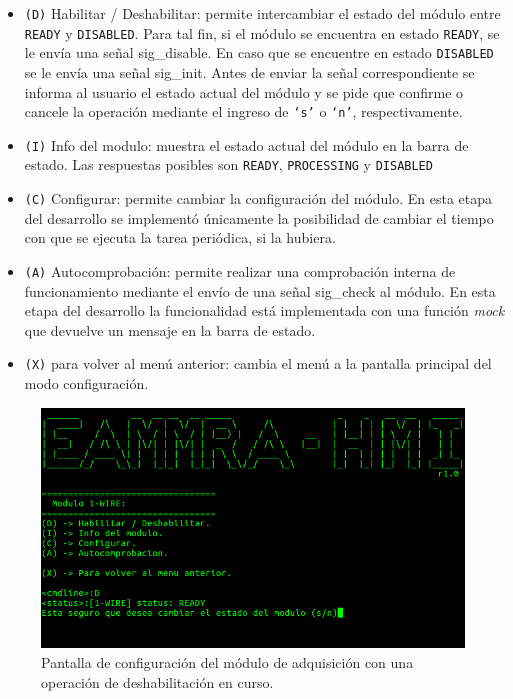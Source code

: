 \begin{itemize}
  \item \texttt{(D)} Habilitar / Deshabilitar: permite intercambiar el estado del módulo entre \texttt{READY} y \texttt{DISABLED}.  Para tal fin, si el módulo se encuentra en estado \texttt{READY}, se le envía una señal sig\_disable.  En caso que se encuentre en estado \texttt{DISABLED} se le envía una señal sig\_init.  Antes de enviar la señal correspondiente se informa al usuario el estado actual del módulo y se pide que confirme o cancele la operación mediante el ingreso de \texttt{`s'} o \texttt{`n'}, respectivamente.
  \item \texttt{(I)} Info del modulo: muestra el estado actual del módulo en la barra de estado.  Las respuestas posibles son \texttt{READY}, \texttt{PROCESSING} y \texttt{DISABLED}
  \item \texttt{(C)} Configurar: permite cambiar la configuración del módulo.  En esta etapa del desarrollo se implementó únicamente la posibilidad de cambiar el tiempo con que se ejecuta la tarea periódica, si la hubiera.
  \item \texttt{(A)} Autocomprobación: permite realizar una comprobación interna de funcionamiento mediante el envío de una señal sig\_check al módulo. En esta etapa del desarrollo la funcionalidad está implementada con una función \textit{mock} que devuelve un mensaje en la barra de estado. 
  \item \texttt{(X)} para volver al menú anterior: cambia el menú a la pantalla principal del modo configuración.
\end{itemize}

\begin{figure}[htpb]
	\centering
	\includegraphics[width=\textwidth]{./Figures/interfaz_config_detalle.png}
	\caption[Pantalla de configuración del módulo de adquisición.]{Pantalla de configuración del módulo de adquisición con una operación de deshabilitación en curso.} 
	\label{fig:interfaz_config_detalle}
\end{figure}

